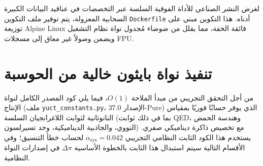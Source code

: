 \documentclass[12pt,a4paper]{article}
\begin{document}
	
	لغرض النشر الصناعي للأداة الفوقية السلسة عبر التخصصات في عناقيد البيانات الكبيرة السحابية المعزولة، يتم توفير ملف التكوين \texttt{Dockerfile} أدناه. هذا التكوين مبني على توزيعة Alpine Linux فائقة الخفة، مما يقلل من ضوضاء مُجدول نواة نظام التشغيل ويضمن وصولاً غير معاق إلى مسجلات FPU.
	
	
	
	\section{تنفيذ نواة بايثون خالية من الحوسبة}
	من أجل التحقق التجريبي من مبدأ الملاحة \(O(1)\)، فيما يلي كود المصدر الكامل لنواة الإنتاج (ملف \texttt{yuct\_constants.py}، الإصدار 37.0-Pure) الذي يوفر حسابًا فوريًا بمقياس النانوثانية لثوابت اللاغرانجيان السلسة (بما في ذلك ثوابت QED، وهندسة الحمض النووي، والجاذبية الديناميكية، وحد تسيرلسون) مع تخصيص ذاكرة ديناميكي صفري. يستخدم هذا الكود الثابت النظامي التجريبي \(\alpha_{\text{sys}} = 0.042\) لحساب خطأ التنسيق؛ وفي الأقسام التالية سيتم استبدال هذا الثابت بالخطوة الأساسية \(\Delta\pi\) في إصدارات النواة النظامية.
	
\end{document}
